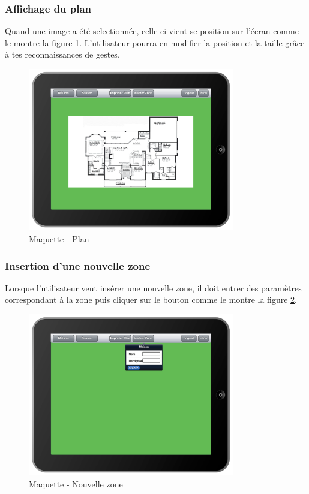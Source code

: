 \subsubsection{Affichage du plan}
Quand une image a été selectionnée, celle-ci vient se position sur l'écran comme le montre la figure \ref{gra:maq06}. L'utilisateur pourra en modifier la position et la taille grâce à tes reconnaissances de gestes.
\begin{figure}[H]
      \centering
      \includegraphics[width=9cm]{00_media/04_Maquette_06.pdf}
      \caption{Maquette - Plan}
      \label{gra:maq06}
\end{figure}
\subsubsection{Insertion d'une nouvelle zone}
Lorsque l'utilisateur veut insérer une nouvelle zone, il doit entrer des paramètres correspondant à la zone puis cliquer sur le bouton comme le montre la figure \ref{gra:maq07}.
\begin{figure}[H]
      \centering
      \includegraphics[width=9cm]{00_media/04_Maquette_07.pdf}
      \caption{Maquette - Nouvelle zone}
      \label{gra:maq07}
\end{figure}
